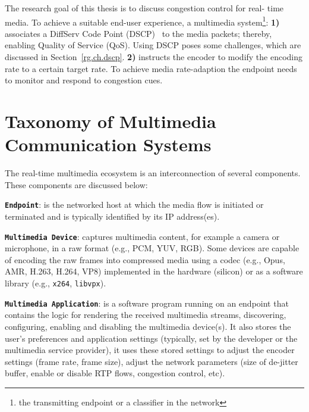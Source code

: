 
The research goal of this thesis is to discuss congestion control for real-
time media. To achieve a suitable end-user experience, a multimedia
system\footnote{the transmitting endpoint or a classifier in the network}:
\textbf{1)} associates a DiffServ Code Point (DSCP)~\cite{rfc2474} to the
media packets; thereby, enabling Quality of Service (QoS). Using DSCP poses
some challenges, which are discussed in Section~\ref{rg.ch.dscp}. \textbf{2)}
instructs the encoder to modify the encoding rate to a certain target rate. To
achieve media rate-adaption the endpoint needs to monitor and respond to
congestion cues.



\section{Taxonomy of Multimedia Communication Systems}

The real-time multimedia ecosystem is an interconnection of several
components. These components are discussed below:

\textbf{\texttt{Endpoint}}: is the networked host at which the media flow is
initiated or terminated and is typically identified by its IP address(es).


\textbf{\texttt{Multimedia Device}}: captures multimedia content, for example
a camera or microphone, in a raw format (e.g., PCM, YUV, RGB). Some devices
are capable of encoding the raw frames into compressed media using a codec
(e.g., Opus, AMR, H.263, H.264, VP8) implemented in the hardware (silicon) or
as a software library (e.g., \texttt{x264}, \texttt{libvpx}).


\textbf{\texttt{Multimedia Application}}: is a software program running on an
endpoint that contains the logic for rendering the received multimedia
streams, discovering, configuring, enabling and disabling the multimedia
device(s). It also stores the user's preferences and application settings
(typically, set by the developer or the multimedia service provider), it uses
these stored settings to adjust the encoder settings (frame rate, frame size),
adjust the network parameters (size of de-jitter buffer, enable or disable RTP
flows, congestion control, etc).

